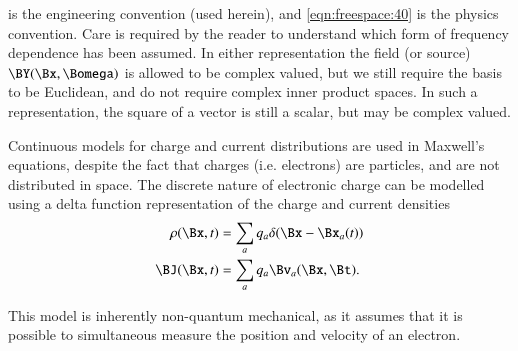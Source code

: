  is the engineering convention (used herein), and \cref{eqn:freespace:40} is the physics convention.
Care is required by the reader to understand which form of frequency dependence has been assumed.
In either representation the field (or source) \( \BY(\Bx, \Bomega) \) is allowed to be complex valued, but we still require the basis to be Euclidean, and do not require complex inner product spaces.  In such a representation, the square of a vector is still a scalar, but may be complex valued.

Continuous models for charge and current distributions are used in Maxwell's equations, despite the
fact that charges (i.e. electrons) are particles, and are not distributed in space.
The discrete nature of electronic charge can be modelled using a delta function representation of the charge and current densities
\begin{dmath}\label{eqn:freespace:240}
\begin{aligned}
\rho(\Bx, t) &= \sum_a q_a \delta( \Bx - \Bx_a( t) ) \\
\BJ(\Bx, t) &= \sum_a q_a \Bv_a( \Bx, \Bt ).
\end{aligned}
\end{dmath}

This model is inherently non-quantum mechanical, as it assumes that it is possible to
simultaneous measure the position and velocity of an electron.


